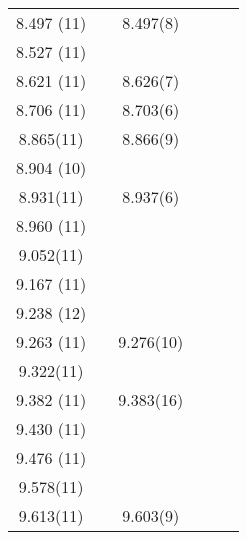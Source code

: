 \begin{center}
\begin{longtable}{cc cc cc}
  8.497 (11)      &          &  8.497(8)        &                     &             &                 \\
  8.527 (11)      &          &                  &                     &             &                 \\
  8.621 (11)      &          &  8.626(7)        &                     &             &                 \\
  8.706 (11)      &          &  8.703(6)        &                     &             &                 \\
   8.865(11)      &          &  8.866(9)        &                     &             &                 \\
  8.904 (10)      &          &                  &                     &             &                 \\
  8.931(11)       &          &  8.937(6)        &                     &             &                 \\
  8.960 (11)      &          &                  &                     &             &                 \\
   9.052(11)      &          &                  &                     &             &                 \\
  9.167 (11)      &          &                  &                     &             &                 \\
  9.238 (12)      &          &                  &                     &             &                 \\
  9.263 (11)      &          &  9.276(10)       &                     &             &                 \\
   9.322(11)      &          &                  &                     &             &                 \\
  9.382 (11)      &          &  9.383(16)       &                     &             &                 \\
  9.430 (11)      &          &                  &                     &             &                 \\
  9.476 (11)      &          &                  &                     &             &                 \\
   9.578(11)      &          &                  &                     &             &                 \\
   9.613(11)      &          &  9.603(9)        &                     &             &                 \\

\end{longtable}
\end{center}
